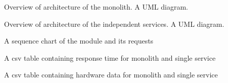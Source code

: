 

Overview of architecture of the monolith.
A UML diagram.

Overview of architecture of the independent services.
A UML diagram.


A sequence chart of the module and its requests

A csv table containing response time for monolith and single service

A csv table containing hardware data for monolith and single service